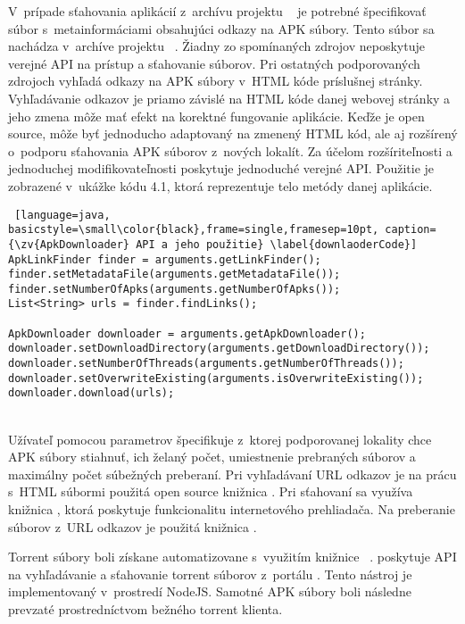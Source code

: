 V~prípade sťahovania aplikácií z~archívu projektu ~\cite{Viennot2014} je potrebné špecifikovať súbor s~metainformáciami obsahujúci odkazy na APK súbory. Tento súbor sa nachádza v~archíve projektu ~\cite{archiveOrg}. Žiadny zo spomínaných zdrojov neposkytuje verejné API na prístup a sťahovanie súborov. Pri ostatných podporovaných zdrojoch  vyhľadá odkazy na APK súbory v~HTML kóde príslušnej stránky. Vyhľadávanie odkazov je priamo závislé na HTML kóde danej webovej stránky a jeho zmena môže mať efekt na korektné fungovanie aplikácie. Keďže je  open source, môže byť jednoducho adaptovaný na zmenený HTML kód, ale aj rozšírený o~podporu sťahovania APK súborov z~nových lokalít. Za účelom rozšíriteľnosti a jednoduchej modifikovateľnosti poskytuje  jednoduché verejné API. Použitie  je zobrazené v~ukážke kódu 4.1, ktorá reprezentuje telo metódy  danej aplikácie. \\
\begin{lstlisting} [language=java, basicstyle=\small\color{black},frame=single,framesep=10pt, caption= {\zv{ApkDownloader} API a jeho použitie} \label{downlaoderCode}]
ApkLinkFinder finder = arguments.getLinkFinder();
finder.setMetadataFile(arguments.getMetadataFile());
finder.setNumberOfApks(arguments.getNumberOfApks());
List<String> urls = finder.findLinks();

ApkDownloader downloader = arguments.getApkDownloader();
downloader.setDownloadDirectory(arguments.getDownloadDirectory());
downloader.setNumberOfThreads(arguments.getNumberOfThreads());
downloader.setOverwriteExisting(arguments.isOverwriteExisting());
downloader.download(urls);
\end{lstlisting}
\mbox{}\\
\noindent Užívateľ pomocou parametrov špecifikuje z~ktorej podporovanej lokality chce APK súbory stiahnuť, ich želaný počet, umiestnenie prebraných súborov a maximálny počet súbežných preberaní. Pri vyhľadávaní URL odkazov je na prácu s~HTML súbormi použitá open source knižnica . Pri sťahovaní sa využíva knižnica , ktorá poskytuje funkcionalitu internetového prehliadača. Na preberanie súborov z~URL odkazov je použitá knižnica . 

Torrent súbory boli získane automatizovane s~využitím knižnice ~\cite{flux}.  poskytuje API na vyhľadávanie a sťahovanie torrent súborov z~portálu . Tento nástroj je implementovaný v~prostredí NodeJS. Samotné APK súbory boli následne prevzaté prostredníctvom bežného torrent klienta.